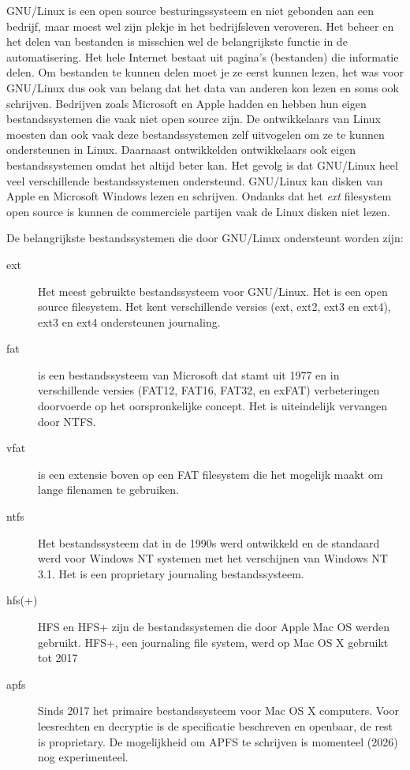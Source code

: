 GNU/Linux is een open source besturingssysteem en niet gebonden aan een bedrijf, maar moest wel zijn plekje in het bedrijfsleven veroveren. Het beheer en het delen van bestanden is misschien wel de belangrijkste functie in de automatisering. Het hele Internet bestaat uit pagina's (bestanden) die informatie delen. Om bestanden te kunnen delen moet je ze eerst kunnen lezen, het was voor GNU/Linux dus ook van belang dat het data van anderen kon lezen en soms ook schrijven. Bedrijven zoals Microsoft en Apple hadden en hebben hun eigen bestandssystemen die vaak niet open source zijn. De ontwikkelaars van Linux moesten dan ook vaak deze bestandssystemen zelf uitvogelen om ze te kunnen ondersteunen in Linux. Daarnaast ontwikkelden ontwikkelaars ook eigen bestandssystemen omdat het altijd beter kan. Het gevolg is dat GNU/Linux heel veel verschillende bestandssystemen ondersteund. GNU/Linux kan disken van Apple en Microsoft Windows lezen en schrijven. Ondanks dat het \textit{ext} filesystem open source is kunnen de commerciele partijen vaak de Linux disken niet lezen.

De belangrijkste bestandssystemen die door GNU/Linux ondersteunt worden zijn:
\begin{description}
\item[ext] Het meest gebruikte bestandssysteem voor GNU/Linux. Het is een open source filesystem. Het kent verschillende versies (ext, ext2, ext3 en ext4), ext3 en ext4 ondersteunen journaling.
\item[fat] is een bestandssysteem van Microsoft dat stamt uit 1977 en in verschillende versies (FAT12, FAT16, FAT32, en exFAT) verbeteringen doorvoerde op het oorspronkelijke concept. Het is uiteindelijk vervangen door NTFS.
\item[vfat] is een extensie boven op een FAT filesystem die het mogelijk maakt om lange filenamen te gebruiken.
\item[ntfs] Het bestandssysteem dat in de 1990s werd ontwikkeld en de standaard werd voor Windows NT systemen met het verschijnen van Windows NT 3.1. Het is een proprietary journaling bestandssysteem.
\item[hfs(+)] HFS en HFS+ zijn de bestandssystemen die door Apple Mac OS werden gebruikt. HFS+, een journaling file system, werd op Mac OS X gebruikt tot 2017
\item[apfs] Sinds 2017 het primaire bestandssysteem voor Mac OS X computers. Voor leesrechten en decryptie is de specificatie beschreven en openbaar, de rest is proprietary. De mogelijkheid om APFS te schrijven is momenteel (2026) nog experimenteel.
\end{description}


